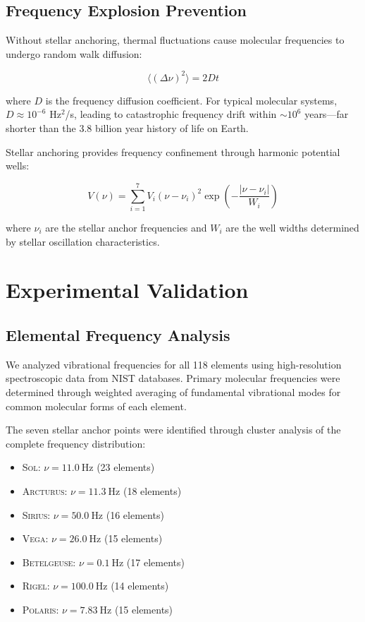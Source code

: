 \documentclass[twocolumn,showpacs,preprintnumbers,amsmath,amssymb]{revtex4-2}
\newcommand{\freq}[1]{\SI{#1}{\hertz}}
\newcommand{\stellar}[1]{\textsc{#1}}
\begin{document}
\subsection{Frequency Explosion Prevention}

Without stellar anchoring, thermal fluctuations cause molecular frequencies to undergo random walk diffusion:

\begin{equation}
\langle(\Delta\nu)^2\rangle = 2Dt
\end{equation}

where $D$ is the frequency diffusion coefficient. For typical molecular systems, $D \approx 10^{-6}$ Hz$^2$/s, leading to catastrophic frequency drift within $\sim 10^6$ years—far shorter than the 3.8 billion year history of life on Earth.

Stellar anchoring provides frequency confinement through harmonic potential wells:

\begin{equation}
V(\nu) = \sum_{i=1}^{7} V_i(\nu - \nu_i)^2 \exp\left(-\frac{|\nu - \nu_i|}{W_i}\right)
\end{equation}

where $\nu_i$ are the stellar anchor frequencies and $W_i$ are the well widths determined by stellar oscillation characteristics.

\section{Experimental Validation}

\subsection{Elemental Frequency Analysis}

We analyzed vibrational frequencies for all 118 elements using high-resolution spectroscopic data from NIST databases. Primary molecular frequencies were determined through weighted averaging of fundamental vibrational modes for common molecular forms of each element.

The seven stellar anchor points were identified through cluster analysis of the complete frequency distribution:

\begin{itemize}
\item \stellar{Sol}: $\nu = \freq{11.0}$ (23 elements)
\item \stellar{Arcturus}: $\nu = \freq{11.3}$ (18 elements)  
\item \stellar{Sirius}: $\nu = \freq{50.0}$ (16 elements)
\item \stellar{Vega}: $\nu = \freq{26.0}$ (15 elements)
\item \stellar{Betelgeuse}: $\nu = \freq{0.1}$ (17 elements)
\item \stellar{Rigel}: $\nu = \freq{100.0}$ (14 elements)
\item \stellar{Polaris}: $\nu = \freq{7.83}$ (15 elements)
\end{itemize}
\end{document}
